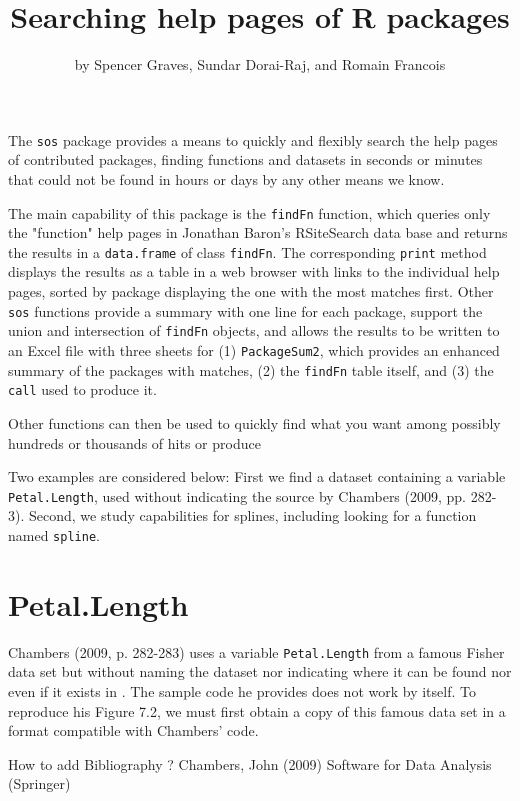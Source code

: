 \title{Searching help pages of R packages}
\author{by Spencer Graves, Sundar Dorai-Raj, and Romain Francois}

\maketitle

The {\tt sos} package provides a means to quickly and
flexibly search the help pages of contributed packages, finding
functions and datasets in seconds or minutes that could not be
found in hours or days by any other means we know.

The main capability of this package is the {\tt findFn} function,
which queries only the "function" help pages in Jonathan Baron's
RSiteSearch data base and returns the results in a {\tt data.frame}
of class {\tt findFn}.  The corresponding {\tt print} method
displays the results as a table in a web browser with links to the
individual help pages, sorted by package displaying the one with the
most matches first.  Other {\tt sos} functions provide a summary
with one line for each package, support the union and intersection
of {\tt findFn} objects, and allows the results to be
written to an Excel file with three sheets for (1) {\tt PackageSum2}, which
provides an enhanced summary of the packages with matches, (2) the
{\tt findFn} table itself, and (3) the {\tt call} used to produce it.

Other \R{} functions can then be used to
quickly find what you want among possibly hundreds or thousands of
hits or produce

Two examples are considered below:  First we find a dataset containing
a variable {\tt Petal.Length}, used without indicating the source 
by Chambers (2009, pp. 282-3).  Second, we study \R{} capabilities 
for splines, including looking for a function named {\tt spline}.

\section*{Petal.Length}

Chambers (2009, p. 282-283) uses a variable {\tt Petal.Length} from a 
famous Fisher data set but without naming the dataset nor indicating 
where it can be found nor even if it exists in \R{}.  The sample 
code he provides does not work by itself.  To reproduce his 
Figure 7.2, we must first obtain a copy of this famous data set 
in a format compatible with Chambers' code.  

How to add Bibliography ?
Chambers, John (2009) Software for Data Analysis (Springer) 

